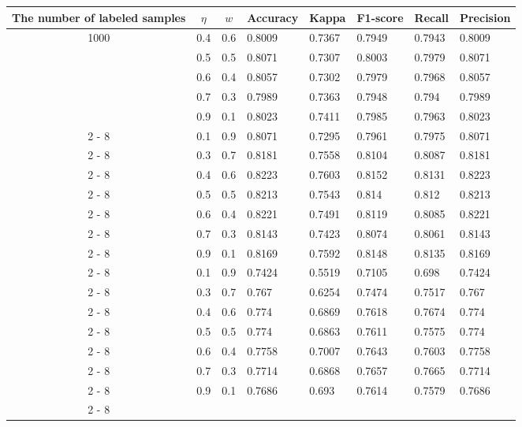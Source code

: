 \begin{tabular}{|c|c|c|l|l|l|l|l|}%
\hline%
The number of labeled samples&$\eta$&$w$&Accuracy&Kappa&F1{-}score&Recall&Precision\\%
\hline%
\multirow{5}{*}{1000}&0.4&0.6&0.8009&0.7367&0.7949&0.7943&0.8009\\%
\cline{2%
-%
8}%
&0.5&0.5&0.8071&0.7307&0.8003&0.7979&0.8071\\%
\cline{2%
-%
8}%
&0.6&0.4&0.8057&0.7302&0.7979&0.7968&0.8057\\%
\cline{2%
-%
8}%
&0.7&0.3&0.7989&0.7363&0.7948&0.794&0.7989\\%
\cline{2%
-%
8}%
&0.9&0.1&0.8023&0.7411&0.7985&0.7963&0.8023\\%
\cline{2%
-%
8}%
\hline%
\multirow{7}{*}{1500}&0.1&0.9&0.8071&0.7295&0.7961&0.7975&0.8071\\%
\cline{2%
-%
8}%
&0.3&0.7&0.8181&0.7558&0.8104&0.8087&0.8181\\%
\cline{2%
-%
8}%
&0.4&0.6&0.8223&0.7603&0.8152&0.8131&0.8223\\%
\cline{2%
-%
8}%
&0.5&0.5&0.8213&0.7543&0.814&0.812&0.8213\\%
\cline{2%
-%
8}%
&0.6&0.4&0.8221&0.7491&0.8119&0.8085&0.8221\\%
\cline{2%
-%
8}%
&0.7&0.3&0.8143&0.7423&0.8074&0.8061&0.8143\\%
\cline{2%
-%
8}%
&0.9&0.1&0.8169&0.7592&0.8148&0.8135&0.8169\\%
\cline{2%
-%
8}%
\hline%
\multirow{7}{*}{500}&0.1&0.9&0.7424&0.5519&0.7105&0.698&0.7424\\%
\cline{2%
-%
8}%
&0.3&0.7&0.767&0.6254&0.7474&0.7517&0.767\\%
\cline{2%
-%
8}%
&0.4&0.6&0.774&0.6869&0.7618&0.7674&0.774\\%
\cline{2%
-%
8}%
&0.5&0.5&0.774&0.6863&0.7611&0.7575&0.774\\%
\cline{2%
-%
8}%
&0.6&0.4&0.7758&0.7007&0.7643&0.7603&0.7758\\%
\cline{2%
-%
8}%
&0.7&0.3&0.7714&0.6868&0.7657&0.7665&0.7714\\%
\cline{2%
-%
8}%
&0.9&0.1&0.7686&0.693&0.7614&0.7579&0.7686\\%
\cline{2%
-%
8}%
\hline%
\end{tabular}